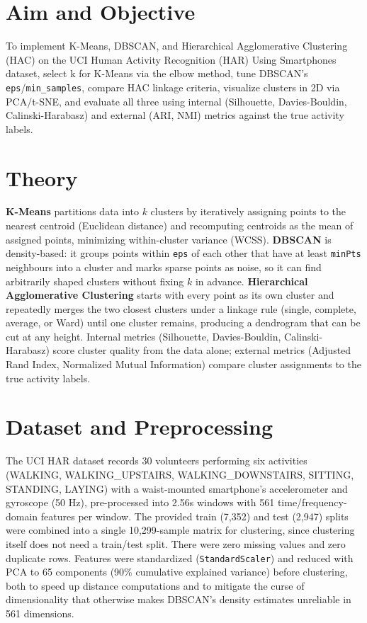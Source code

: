 \documentclass[11pt,a4paper]{article}
\begin{document}
\section{Aim and Objective}
To implement K-Means, DBSCAN, and Hierarchical Agglomerative Clustering (HAC) on the UCI Human Activity Recognition (HAR) Using Smartphones dataset, select k for K-Means via the elbow method, tune DBSCAN's \texttt{eps}/\texttt{min\_samples}, compare HAC linkage criteria, visualize clusters in 2D via PCA/t-SNE, and evaluate all three using internal (Silhouette, Davies-Bouldin, Calinski-Harabasz) and external (ARI, NMI) metrics against the true activity labels.

\section{Theory}
\textbf{K-Means} partitions data into $k$ clusters by iteratively assigning points to the nearest centroid (Euclidean distance) and recomputing centroids as the mean of assigned points, minimizing within-cluster variance (WCSS). \textbf{DBSCAN} is density-based: it groups points within \texttt{eps} of each other that have at least \texttt{minPts} neighbours into a cluster and marks sparse points as noise, so it can find arbitrarily shaped clusters without fixing $k$ in advance. \textbf{Hierarchical Agglomerative Clustering} starts with every point as its own cluster and repeatedly merges the two closest clusters under a linkage rule (single, complete, average, or Ward) until one cluster remains, producing a dendrogram that can be cut at any height. Internal metrics (Silhouette, Davies-Bouldin, Calinski-Harabasz) score cluster quality from the data alone; external metrics (Adjusted Rand Index, Normalized Mutual Information) compare cluster assignments to the true activity labels.

\section{Dataset and Preprocessing}
The UCI HAR dataset records 30 volunteers performing six activities (WALKING, WALKING\_UPSTAIRS, WALKING\_DOWNSTAIRS, SITTING, STANDING, LAYING) with a waist-mounted smartphone's accelerometer and gyroscope (50 Hz), pre-processed into 2.56s windows with 561 time/frequency-domain features per window. The provided train (7,352) and test (2,947) splits were combined into a single 10,299-sample matrix for clustering, since clustering itself does not need a train/test split. There were zero missing values and zero duplicate rows. Features were standardized (\texttt{StandardScaler}) and reduced with PCA to 65 components (90\% cumulative explained variance) before clustering, both to speed up distance computations and to mitigate the curse of dimensionality that otherwise makes DBSCAN's density estimates unreliable in 561 dimensions.
\end{document}
